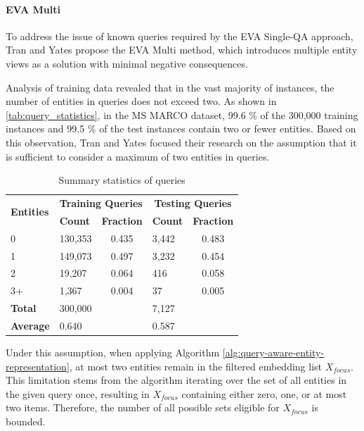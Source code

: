 \paragraph*{EVA Multi}

To address the issue of known queries required by the EVA Single-QA approach, Tran and Yates propose the EVA Multi method, which introduces multiple entity views as a solution with minimal negative consequences.

Analysis of training data revealed that in the vast majority of instances, the number of entities in queries does not exceed two. As shown in \autoref{tab:query_statistics}, in the MS MARCO dataset, 99.6 \% of the 300,000 training instances and 99.5 \% of the test instances contain two or fewer entities. Based on this observation, Tran and Yates focused their research on the assumption that it is sufficient to consider a maximum of two entities in queries.

\begin{table}[!htb]
    \centering
    \footnotesize
    \begin{tabular}{lp{2cm}cp{2cm}c}
    \hline
    \multirow{2}{*}{\textbf{Entities}} & \multicolumn{2}{c}{\textbf{Training Queries}} & \multicolumn{2}{c}{\textbf{Testing Queries}} \\
                                 & \textbf{Count}           & \textbf{Fraction}          & \textbf{Count}           & \textbf{Fraction}          \\
    \hline
    0 & 130,353 & 0.435 & 3,442 & 0.483 \\
    1 & 149,073 & 0.497 & 3,232 & 0.454 \\
    2 & 19,207 & 0.064 & 416 & 0.058 \\
    3+ & 1,367 & 0.004 & 37 & 0.005 \\
    \hline
    \textbf{Total} & 300,000 &  & 7,127 &  \\
    \textbf{Average} & 0.640 &  & 0.587 &  \\
    \hline
    \end{tabular}
    \caption{Summary statistics of queries}
    \label{tab:query_statistics}
\end{table}

Under this assumption, when applying Algorithm \ref{alg:query-aware-entity-representation}, at most two entities remain in the filtered embedding list $X_{focus}$. This limitation stems from the algorithm iterating over the set of all entities in the given query once, resulting in $X_{focus}$ containing either zero, one, or at most two items. Therefore, the number of all possible sets eligible for $X_{focus}$ is bounded.

